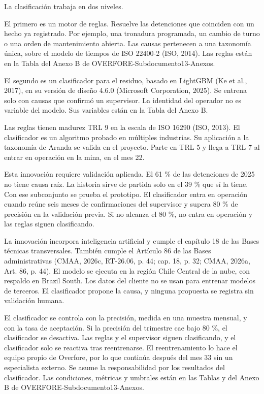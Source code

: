 \documentclass[subdoc]{../../comun/overfore}
\begin{document}
La clasificación trabaja en dos niveles.

El primero es un motor de reglas. Resuelve las detenciones que coinciden con un hecho ya registrado. Por ejemplo, una tronadura programada, un cambio de turno o una orden de mantenimiento abierta. Las causas pertenecen a una taxonomía única, sobre el modelo de tiempos de ISO 22400-2 (ISO, 2014). Las reglas están en la Tabla  del Anexo B de OVERFORE-Subdocumento13-Anexos.

El segundo es un clasificador para el residuo, basado en LightGBM (Ke et al., 2017), en su versión de diseño 4.6.0 (Microsoft Corporation, 2025). Se entrena solo con causas que confirmó un supervisor. La identidad del operador no es variable del modelo. Sus variables están en la Tabla  del Anexo B.

Las reglas tienen madurez TRL 9 en la escala de ISO 16290 (ISO, 2013). El clasificador es un algoritmo probado en múltiples industrias. Su aplicación a la taxonomía de Aranda se valida en el proyecto. Parte en TRL 5 y llega a TRL 7 al entrar en operación en la mina, en el mes 22.

Esta innovación requiere validación aplicada. El 61 \% de las detenciones de 2025 no tiene causa raíz. La historia sirve de partida solo en el 39 \% que sí la tiene. Con ese subconjunto se prueba el prototipo. El clasificador entra en operación cuando reúne seis meses de confirmaciones del supervisor y supera 80 \% de precisión en la validación previa. Si no alcanza el 80 \%, no entra en operación y las reglas siguen clasificando.

La innovación incorpora inteligencia artificial y cumple el capítulo 18 de las Bases técnicas transversales. También cumple el Artículo 86 de las Bases administrativas (CMAA, 2026c, RT-26.06, p. 44; cap. 18, p. 32; CMAA, 2026a, Art. 86, p. 44). El modelo se ejecuta en la región Chile Central de la nube, con respaldo en Brazil South. Los datos del cliente no se usan para entrenar modelos de terceros. El clasificador propone la causa, y ninguna propuesta se registra sin validación humana.

El clasificador se controla con la precisión, medida en una muestra mensual, y con la tasa de aceptación. Si la precisión del trimestre cae bajo 80 \%, el clasificador se desactiva. Las reglas y el supervisor siguen clasificando, y el clasificador solo se reactiva tras reentrenarse. El reentrenamiento lo hace el equipo propio de Overfore, por lo que continúa después del mes 33 sin un especialista externo. Se asume la responsabilidad por los resultados del clasificador. Las condiciones, métricas y umbrales están en las Tablas  y  del Anexo B de OVERFORE-Subdocumento13-Anexos.
\end{document}
